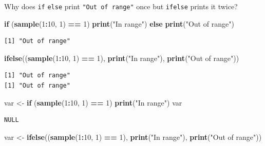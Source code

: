 \documentclass[]{book}
\newenvironment{Shaded}{\begin{snugshade}}{\end{snugshade}}
\newcommand{\ControlFlowTok}[1]{\textcolor[rgb]{0.13,0.29,0.53}{\textbf{#1}}}
\newcommand{\DecValTok}[1]{\textcolor[rgb]{0.00,0.00,0.81}{#1}}
\newcommand{\KeywordTok}[1]{\textcolor[rgb]{0.13,0.29,0.53}{\textbf{#1}}}
\newcommand{\NormalTok}[1]{#1}
\newcommand{\OperatorTok}[1]{\textcolor[rgb]{0.81,0.36,0.00}{\textbf{#1}}}
\newcommand{\StringTok}[1]{\textcolor[rgb]{0.31,0.60,0.02}{#1}}
\begin{document}
Why does \texttt{if} \texttt{else} print \texttt{"Out\ of\ range"} once but \texttt{ifelse} prints it twice?

\begin{Shaded}
\begin{Highlighting}[]
\ControlFlowTok{if}\NormalTok{ (}\KeywordTok{sample}\NormalTok{(}\DecValTok{1}\OperatorTok{:}\DecValTok{10}\NormalTok{, }\DecValTok{1}\NormalTok{) }\OperatorTok{==}\StringTok{ }\DecValTok{1}\NormalTok{) }\KeywordTok{print}\NormalTok{(}\StringTok{"In range"}\NormalTok{) }\ControlFlowTok{else} \KeywordTok{print}\NormalTok{(}\StringTok{"Out of range"}\NormalTok{)}
\end{Highlighting}
\end{Shaded}

\begin{verbatim}
[1] "Out of range"
\end{verbatim}

\begin{Shaded}
\begin{Highlighting}[]
\KeywordTok{ifelse}\NormalTok{((}\KeywordTok{sample}\NormalTok{(}\DecValTok{1}\OperatorTok{:}\DecValTok{10}\NormalTok{, }\DecValTok{1}\NormalTok{) }\OperatorTok{==}\StringTok{ }\DecValTok{1}\NormalTok{), }\KeywordTok{print}\NormalTok{(}\StringTok{"In range"}\NormalTok{), }\KeywordTok{print}\NormalTok{(}\StringTok{"Out of range"}\NormalTok{))}
\end{Highlighting}
\end{Shaded}

\begin{verbatim}
[1] "Out of range"
[1] "Out of range"
\end{verbatim}

\begin{Shaded}
\begin{Highlighting}[]
\NormalTok{var <-}\StringTok{ }\ControlFlowTok{if}\NormalTok{ (}\KeywordTok{sample}\NormalTok{(}\DecValTok{1}\OperatorTok{:}\DecValTok{10}\NormalTok{, }\DecValTok{1}\NormalTok{) }\OperatorTok{==}\StringTok{ }\DecValTok{1}\NormalTok{) }\KeywordTok{print}\NormalTok{(}\StringTok{"In range"}\NormalTok{)}
\NormalTok{var}
\end{Highlighting}
\end{Shaded}

\begin{verbatim}
NULL
\end{verbatim}

\begin{Shaded}
\begin{Highlighting}[]
\NormalTok{var <-}\StringTok{ }\KeywordTok{ifelse}\NormalTok{((}\KeywordTok{sample}\NormalTok{(}\DecValTok{1}\OperatorTok{:}\DecValTok{10}\NormalTok{, }\DecValTok{1}\NormalTok{) }\OperatorTok{==}\StringTok{ }\DecValTok{1}\NormalTok{), }\KeywordTok{print}\NormalTok{(}\StringTok{"In range"}\NormalTok{), }\KeywordTok{print}\NormalTok{(}\StringTok{"Out of range"}\NormalTok{))}
\end{Highlighting}
\end{Shaded}
\end{document}

